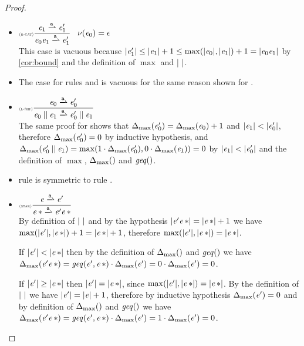 \begin{proof}
\begin{description}
\begin{itemize}
    \item $\Rule{r-cat}{\re_1\parDer{\sym}\re'_1}{\re_0\catop\re_1\parDer{\sym}\re'_1}{\hasEps{\re_0}=\eps}$\\[2ex]
          This case is vacuous because ${\mid}{\mathit {e}_1'}{\mid}\leq{\mid}{\ensuremath{\mathit {e}}_1}{\mid}+1\leq\max({\mid}{\mathit {e}_0}{\mid},{\mid}{\mathit {e}_1}{\mid})+1={\mid}{\mathit {e}_0\mathit {e}_1}{\mid}$ by \cref{cor:bound} and the definition of $\max$ and ${\mid}{\ }{\mid}$.

    \item The case for rules  and  is vacuous for the same reason shown for .
    \item $\Rule{l-shf}{\re_0\parDer{\sym}\re'_0}{\re_0\shuffleop\re_1\parDer{\sym}\re'_0\shuffleop\re_1}{}$\\[2ex]
          The same proof for  shows that ${\Delta_{\max}}({\mathit {e}_0'})={\Delta_{\max}}({\mathit {e}_0})+1$ and ${\mid}{\mathit {e}_1}{\mid}<{\mid}{\mathit {e}'_0}{\mid}$, therefore ${\Delta_{\max}}({\mathit {e}'_0})=0$ by inductive hypothesis, and ${\Delta_{\max}}({\mathit {e}'_0\mathbin{||}\mathit {e}_1})=\max(1\cdot{\Delta_{\max}}({\mathit {e}_0'}),0\cdot{\Delta_{\max}}({\mathit {e}_1}))=0$ by ${\mid}{\mathit {e}_1}{\mid}<{\mid}{\mathit {e}'_0}{\mid}$ and the definition of $\max$, ${\Delta_{\max}}({})$ and $\mathit{geq}()$.
    \item rule  is symmetric to rule .
    \item $\Rule{star}{\re\parDer{\sym}\re'}{\starop{\re}\parDer{\sym}\re'\catop\starop{\re}}{}$\\[2ex]
          By definition of ${\mid}{\ }{\mid}$ and by the hypothesis ${\mid}{\mathit {e}'{{\mathit {e}}\mathop{*}}}{\mid}={\mid}{{{\mathit {e}}\mathop{*}}}{\mid}+1$ we have
          $\max({\mid}{\mathit {e}'}{\mid},{\mid}{{{\mathit {e}}\mathop{*}}}{\mid})+1={\mid}{{{\mathit {e}}\mathop{*}}}{\mid}+1$, therefore
          $\max({\mid}{\mathit {e}'}{\mid},{\mid}{{{\mathit {e}}\mathop{*}}}{\mid})={\mid}{{{\mathit {e}}\mathop{*}}}{\mid}$.

          If ${\mid}{\mathit {e}'}{\mid}<{\mid}{{{\mathit {e}}\mathop{*}}}{\mid}$ then by the definition of ${\Delta_{\max}}({})$ and $\mathit{geq}()$ we have ${\Delta_{\max}}({\mathit {e}'{{\mathit {e}}\mathop{*}}})=\mathit{geq}({\mathit {e}'},{{{\mathit {e}}\mathop{*}}})\cdot{\Delta_{\max}}({\mathit {e}'})=0\cdot{\Delta_{\max}}({\mathit {e}'})=0$.

          If ${\mid}{\mathit {e}'}{\mid}\geq{\mid}{{{\ensuremath{\mathit {e}}}\mathop{*}}}{\mid}$ then ${\mid}{\mathit {e}'}{\mid}={\mid}{{{\mathit {e}}\mathop{*}}}{\mid}$, since $\max({\mid}{\mathit {e}'}{\mid},{\mid}{{{\mathit {e}}\mathop{*}}}{\mid})={\mid}{{{\mathit {e}}\mathop{*}}}{\mid}$.
          By the definition of ${\mid}{\ }{\mid}$ we have ${\mid}{\mathit {e}'}{\mid}={\mid}{\mathit {e}}{\mid}+1$, therefore
          by inductive hypothesis ${\Delta_{\max}}({\mathit {e}'})=0$ and by definition of ${\Delta_{\max}}({})$ and $\mathit{geq}()$ we have ${\Delta_{\max}}({\mathit {e}'{{\mathit {e}}\mathop{*}}})=\mathit{geq}({\mathit {e}'},{{{\mathit {e}}\mathop{*}}})\cdot{\Delta_{\max}}({\mathit {e}'})=1\cdot{\Delta_{\max}}({\mathit {e}'})=0$.
   \end{itemize}
 \end{description}
\end{proof}

